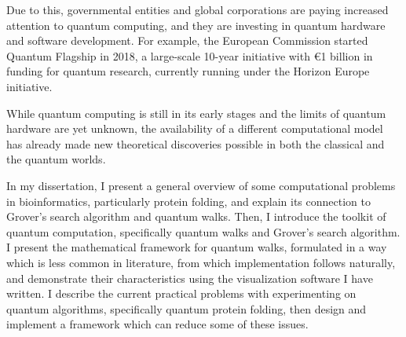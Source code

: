 Due to this, governmental entities and global corporations are paying increased attention to quantum computing, and they are investing in quantum hardware and software development. For example, the European Commission started Quantum Flagship in 2018, a large-scale 10-year initiative with €1 billion in funding for quantum research, currently running under the Horizon Europe initiative.

While quantum computing is still in its early stages and the limits of quantum hardware are yet unknown, the availability of a different computational model has already made new theoretical discoveries possible in both the classical and the quantum worlds.

In my dissertation, I present a general overview of some computational problems in bioinformatics, particularly protein folding, and explain its connection to Grover's search algorithm and quantum walks. Then, I introduce the toolkit of quantum computation, specifically quantum walks and Grover's search algorithm. I present the mathematical framework for quantum walks, formulated in a way which is less common in literature, from which implementation follows naturally, and demonstrate their characteristics using the visualization software I have written. I describe the current practical problems with experimenting on quantum algorithms, specifically quantum protein folding, then design and implement a framework which can reduce some of these issues.

\vfill
\selectthesislanguage

\afterpage{\null\newpage}

\setcounter{romanPage}{\value{page}}
